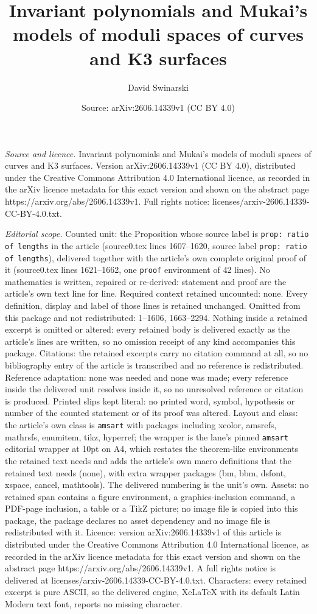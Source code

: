 \documentclass[10pt,a4paper]{amsart}
\title[Invariant polynomials and Mukai's models of moduli spaces of]{Invariant polynomials and Mukai's models of moduli spaces of curves and K3 surfaces}
\author{David Swinarski}
\date{Source: arXiv:2606.14339v1 (CC BY 4.0)}
\begin{document}
\maketitle

\noindent\emph{Source and licence.} Invariant polynomials and Mukai's models of moduli spaces of curves and K3 surfaces. Version arXiv:2606.14339v1 (CC BY 4.0), distributed under the Creative Commons Attribution 4.0 International licence, as recorded in the arXiv licence metadata for this exact version and shown on the abstract page https://arxiv.org/abs/2606.14339v1. Full rights notice: licenses/arxiv-2606.14339-CC-BY-4.0.txt.\par\smallskip

\noindent\textit{Editorial scope.} Counted unit: the Proposition whose source label is \texttt{prop: ratio of lengths} in the article (source0.tex lines 1607--1620, source label \texttt{prop: ratio of lengths}), delivered together with the article's own complete original proof of it (source0.tex lines 1621--1662, one \texttt{proof} environment of 42 lines). No mathematics is written, repaired or re-derived: statement and proof are the article's own text line for line. Required context retained uncounted: none. Every definition, display and label of those lines is retained unchanged. Omitted from this package and not redistributed: 1--1606, 1663--2294. Nothing inside a retained excerpt is omitted or altered: every retained body is delivered exactly as the article's lines are written, so no omission receipt of any kind accompanies this package. Citations: the retained excerpts carry no citation command at all, so no bibliography entry of the article is transcribed and no reference is redistributed. Reference adaptation: none was needed and none was made; every reference inside the delivered unit resolves inside it, so no unresolved reference or citation is produced. Printed slips kept literal: no printed word, symbol, hypothesis or number of the counted statement or of its proof was altered. Layout and class: the article's own class is \texttt{amsart} with packages including xcolor, amsrefs, mathrsfs, enumitem, tikz, hyperref; the wrapper is the lane's pinned \texttt{amsart} editorial wrapper at 10pt on A4, which restates the theorem-like environments the retained text needs and adds the article's own macro definitions that the retained text needs (none), with extra wrapper packages (bm, bbm, dsfont, xspace, cancel, mathtools). The delivered numbering is the unit's own. Assets: no retained span contains a figure environment, a graphics-inclusion command, a PDF-page inclusion, a table or a TikZ picture; no image file is copied into this package, the package declares no asset dependency and no image file is redistributed with it. Licence: version arXiv:2606.14339v1 of this article is distributed under the Creative Commons Attribution 4.0 International licence, as recorded in the arXiv licence metadata for this exact version and shown on the abstract page https://arxiv.org/abs/2606.14339v1. A full rights notice is delivered at licenses/arxiv-2606.14339-CC-BY-4.0.txt. Characters: every retained excerpt is pure ASCII, so the delivered engine, XeLaTeX with its default Latin Modern text font, reports no missing character.
\end{document}
